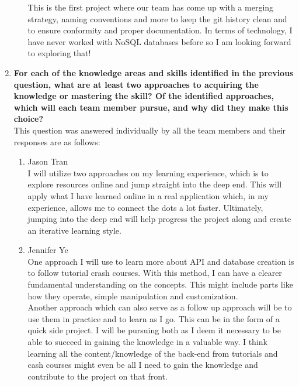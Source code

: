 \documentclass[12pt]{article}
\begin{document}
\begin{enumerate}
\begin{enumerate}
    This is the first project where our team has come up with a merging strategy, naming conventions and more to keep the git history clean and to ensure conformity and proper documentation.
    In terms of technology, I have never worked with NoSQL databases before so I am looking forward to exploring that!
  \end{enumerate}
  \item \textbf{For each of the knowledge areas and skills identified in the previous
  question, what are at least two approaches to acquiring the knowledge or
  mastering the skill?  Of the identified approaches, which will each team
  member pursue, and why did they make this choice?}\\

  This question was answered individually by all the team members and their responses are as follows:\\
  \begin{enumerate}
    \item Jason Tran\\
    I will utilize two approaches on my learning experience, which is to explore resources online and jump straight into the deep end. This will apply what I have learned online in a real application
    which, in my experience, allows me to connect the dots a lot faster. Ultimately, jumping into the deep end will help progress the project along and create an iterative learning style.
    \newline
    \item Jennifer Ye\\
    One approach I will use to learn more about API and database creation is to follow tutorial crash courses. With this method, I can have a clearer fundamental understanding on the concepts.
    This might include parts like how they operate, simple manipulation and customization.\\
    
    Another approach which can also serve as a follow up approach will be to use them in practice and to learn as I go. This can be in the form of a quick side project. I will be pursuing both as
    I deem it necessary to be able to succeed in gaining the knowledge in a valuable way. I think learning all the content/knowledge of the back-end from tutorials and cash courses might even be all
    I need to gain the knowledge and contribute to the project on that front.\\
    

\end{enumerate}
\end{enumerate}
\end{document}
